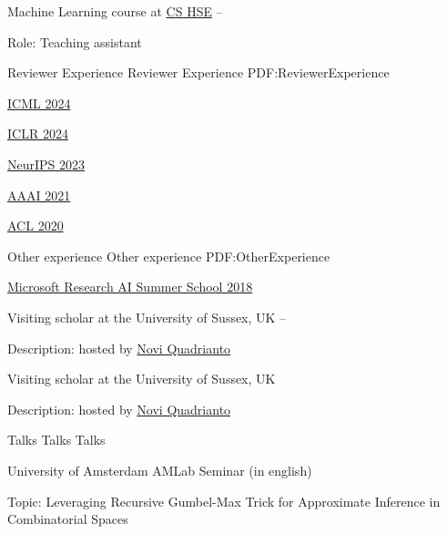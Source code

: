 \documentclass[letterpaper,MMMyyyy,nonstopmode]{simpleresumecv}
\begin{document}
\begin{Body}
\BulletItem
Machine Learning course at \href{https://cs.hse.ru/en/}{CS HSE}
\hfill
{} --
\begin{Detail}
\Item
Role: Teaching assistant
\end{Detail}


\Section
{Reviewer Experience}
{Reviewer Experience}
{PDF:ReviewerExperience}

\BulletItem
\href{https://icml.cc}{ICML 2024}

\BulletItem
\href{https://iclr.cc}{ICLR 2024}

\BulletItem
\href{https://neurips.cc}{NeurIPS 2023}

\BulletItem
\href{https://aaai.org/Conferences/AAAI-21/}{AAAI 2021}

\BulletItem
\href{https://acl2020.org}{ACL 2020}



\Section
{Other experience}
{Other experience}
{PDF:OtherExperience}

\Gap
\BulletItem
\href{https://www.microsoft.com/en-us/research/event/ai-summer-school-2018/}{Microsoft Research AI Summer School 2018}
\hfill
{}

\BulletItem Visiting scholar at the University of Sussex, UK
\hfill
{} --
\begin{Detail}
\Item
Description: hosted by \href{http://www.sussex.ac.uk/profiles/335583}{Novi Quadrianto}
\end{Detail}

\BulletItem Visiting scholar at the University of Sussex, UK
\hfill
{}
\begin{Detail}
\Item
Description: hosted by \href{http://www.sussex.ac.uk/profiles/335583}{Novi Quadrianto}
\end{Detail}



\Section
{Talks}
{Talks}
{Talks}

\Item
University of Amsterdam AMLab Seminar (in english)
\hfill
{}
\begin{Detail}
\Item
Topic: Leveraging Recursive Gumbel-Max Trick for Approximate Inference in Combinatorial Spaces
\end{Detail}


\end{Body}
\end{document}
